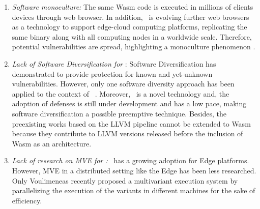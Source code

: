 \begin{enumerate}
    
    \item \emph{Software monoculture:}  
    The same Wasm code is executed in millions of clients devices through web browser.
    In addition, \wasm\ is evolving further web browsers as a technology to support edge-cloud computing platforms, \ie replicating the same binary along with all computing nodes in a worldwide scale. Therefore, potential vulnerabilities are spread, highlighting a monoculture phenomenon \cite{Harrand1650630}. 

    \item \emph{Lack of Software Diversification for \wasm}:  Software Diversification has demonstrated to provide protection for known and yet-unknown vulnerabilities. However, only one software diversity approach has been applied to the context of \wasm\ \cite{wobfuscator}. 
    Moreover, \wasm\ is a novel technology and, the adoption of defenses is still under development \cite{Narayan2021Swivel, johnson2021} and has a low pace, making software diversification a possible preemptive technique.
    Besides, the preexisting works based on the LLVM pipeline cannot be extended to Wasm because they contribute to LLVM versions released before the inclusion of Wasm as an architecture. 
    
    \item \emph{Lack of research on MVE for \wasm:} \wasm\ has a growing adoption for Edge platforms. However, MVE in a distributed setting like the Edge has been less researched. Only Voulimeneas \etal \cite{voulimeneas2021dmvx} recently proposed a multivariant execution system by parallelizing the execution of the variants in different machines for the sake of efficiency. 


\end{enumerate}







